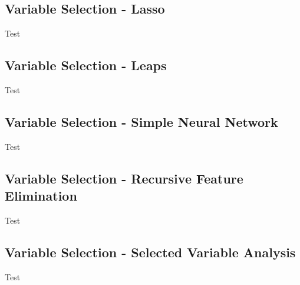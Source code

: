 \subsection{Variable Selection - Lasso}
Test

\subsection{Variable Selection - Leaps}
Test

\subsection{Variable Selection - Simple Neural Network}
Test

\subsection{Variable Selection - Recursive Feature Elimination}
Test

\subsection{Variable Selection - Selected Variable Analysis}
Test
